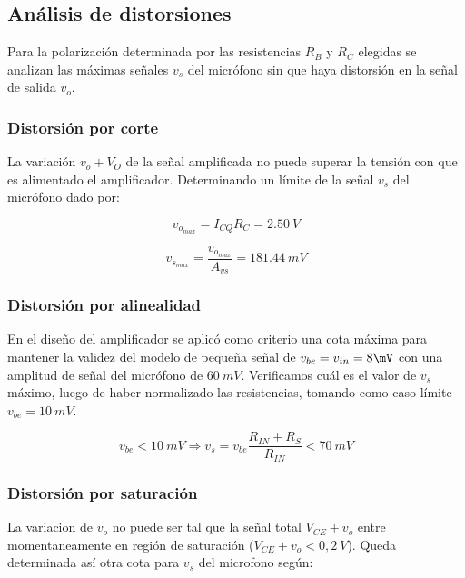 \documentclass[a4paper, 10pt, spanish]{article}
\numberwithin{equation}{section}
\numberwithin{table}{section}
\begin{document}
\newpage
\subsection{Análisis de distorsiones}
Para la polarización determinada por las resistencias $R_B$ y $R_C$ elegidas se analizan las máximas señales $v_s$ del micrófono sin que haya distorsión en la señal de salida $v_o$.

\subsubsection{Distorsión por corte}
La variación $v_o + V_O$ de la señal amplificada no puede superar la tensión con que es alimentado el amplificador. Determinando un límite de la señal $v_s$ del micrófono dado por:

\begin{equation}
v_{o}_{max} = I_{CQ} R_C = 2.50\ V \nonumber
\end{equation}

\begin{equation}
v_s_{max} = \frac{v_{o}_{max}}{A_{vs}} = 181.44\ mV \nonumber
\end{equation}

\subsubsection{Distorsión por alinealidad}
En el diseño del amplificador se aplicó como criterio una cota máxima para mantener la validez del modelo de pequeña señal de $v_{be} = v_{in} = 8 \mV$ con una amplitud de señal del micrófono de $60\ mV$. Verificamos cuál es el valor de $v_s$ máximo, luego de haber normalizado las resistencias, tomando como caso límite $v_{be} = 10\ mV$.

\begin{equation}
v_{be} < 10\ mV \Rightarrow v_s = v_{be}\frac{R_{IN} + R_S}{R_{IN}} < 70\ mV \nonumber
\end{equation}


\subsubsection{Distorsión por saturación}
La variacion de $v_o$ no puede ser tal que la señal total $V_{CE} + v_o$ entre momentaneamente en región de saturación ($V_{CE} + v_o < 0,2\ V$). Queda determinada así otra cota para $v_s$ del microfono según:
\end{document}
